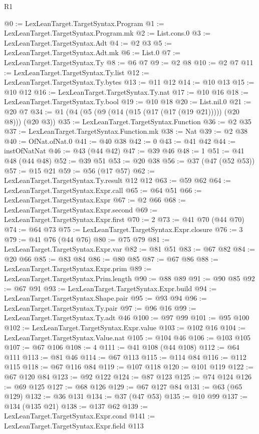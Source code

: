 \begin{lexlean}{R1}
\begin{coremodule}
{{{{{{{{{{{{{{{{{{{{{{{{{{{{{{{{{{{{{{{{@0 := LexLeanTarget.TargetSyntax.Program
@1 := LexLeanTarget.TargetSyntax.Program.mk
@2 := List.cons.{0}
@3 := LexLeanTarget.TargetSyntax.Adt
@4 := @2 @3
@5 := LexLeanTarget.TargetSyntax.Adt.mk
@6 := List.{0}
@7 := LexLeanTarget.TargetSyntax.Ty
@8 := @6 @7
@9 := @2 @8
@10 := @2 @7
@11 := LexLeanTarget.TargetSyntax.Ty.list
@12 := LexLeanTarget.TargetSyntax.Ty.bytes
@13 := @11 @12
@14 := @10 @13
@15 := @10 @12
@16 := LexLeanTarget.TargetSyntax.Ty.nat
@17 := @10 @16
@18 := LexLeanTarget.TargetSyntax.Ty.bool
@19 := @10 @18
@20 := List.nil.{0}
@21 := @20 @7
@34 := @1 (@4 (@5 (@9 (@14 (@15 (@17 (@17 (@19 @21))))) (@20 @8))) (@20 @3))
@35 := LexLeanTarget.TargetSyntax.Function
@36 := @2 @35
@37 := LexLeanTarget.TargetSyntax.Function.mk
@38 := Nat
@39 := @2 @38
@40 := OfNat.ofNat.{0}
@41 := @40 @38
@42 := 0
@43 := @41 @42
@44 := instOfNatNat
@46 := @43 (@44 @42)
@47 := @39 @46
@48 := 1
@51 := @41 @48 (@44 @48)
@52 := @39 @51
@53 := @20 @38
@56 := @37 (@47 (@52 @53))
@57 := @15 @21
@59 := @56 (@17 @57)
@62 := LexLeanTarget.TargetSyntax.Ty.result @12 @12
@63 := @59 @62
@64 := LexLeanTarget.TargetSyntax.Expr.call
@65 := @64 @51
@66 := LexLeanTarget.TargetSyntax.Expr
@67 := @2 @66
@68 := LexLeanTarget.TargetSyntax.Expr.second
@69 := LexLeanTarget.TargetSyntax.Expr.first
@70 := 2
@73 := @41 @70 (@44 @70)
@74 := @64 @73
@75 := LexLeanTarget.TargetSyntax.Expr.closure
@76 := 3
@79 := @41 @76 (@44 @76)
@80 := @75 @79
@81 := LexLeanTarget.TargetSyntax.Expr.var
@82 := @81 @51
@83 := @67 @82
@84 := @20 @66
@85 := @83 @84
@86 := @80 @85
@87 := @67 @86
@88 := LexLeanTarget.TargetSyntax.Expr.prim
@89 := LexLeanTarget.TargetSyntax.Prim.length
@90 := @88 @89
@91 := @90 @85
@92 := @67 @91
@93 := LexLeanTarget.TargetSyntax.Expr.build
@94 := LexLeanTarget.TargetSyntax.Shape.pair
@95 := @93 @94
@96 := LexLeanTarget.TargetSyntax.Ty.pair
@97 := @96 @16
@99 := LexLeanTarget.TargetSyntax.Ty.adt @46
@100 := @97 @99
@101 := @95 @100
@102 := LexLeanTarget.TargetSyntax.Expr.value
@103 := @102 @16
@104 := LexLeanTarget.TargetSyntax.Value.nat
@105 := @104 @46
@106 := @103 @105
@107 := @67 @106
@108 := 4
@111 := @41 @108 (@44 @108)
@112 := @64 @111
@113 := @81 @46
@114 := @67 @113
@115 := @114 @84
@116 := @112 @115
@118 := @67 @116 @84
@119 := @107 @118
@120 := @101 @119
@122 := @67 @120 @84
@123 := @92 @122
@124 := @87 @123
@125 := @74 @124
@126 := @69 @125
@127 := @68 @126
@129 := @67 @127 @84
@131 := @63 (@65 @129)
@132 := @36 @131
@134 := @37 (@47 @53)
@135 := @10 @99
@137 := @134 (@135 @21)
@138 := @137 @62
@139 := LexLeanTarget.TargetSyntax.Expr.cond
@141 := LexLeanTarget.TargetSyntax.Expr.field @113
}}}}}}}}}}}}}}}}}}}}}}}}}}}}}}}}}}}}}}}}
\end{coremodule}
\end{lexlean}
